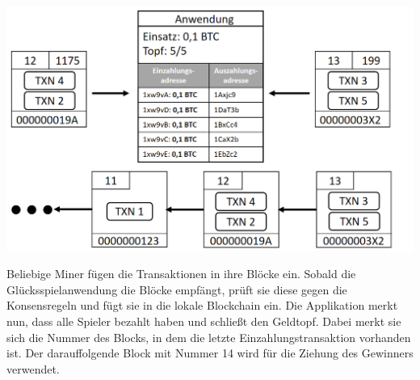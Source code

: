 \vspace{1cm}
\begin{minipage}{0.55\textwidth}
\includegraphics[width=\textwidth]{Figures/konzept_btc/konzept8}
\centering
\decoRule
{}
\label{fig:konzept8}
\end{minipage}
\begin{minipage}{0.45\textwidth}
Beliebige Miner fügen die Transaktionen in ihre Blöcke ein. Sobald die Glücksspielanwendung die Blöcke empfängt, prüft sie diese gegen die Konsensregeln und fügt sie in die lokale Blockchain ein.
Die Applikation merkt nun, dass alle Spieler bezahlt haben und schließt den Geldtopf. Dabei merkt sie sich die Nummer des Blocks, in dem die letzte Einzahlungstransaktion vorhanden ist. Der darauffolgende Block mit Nummer 14 wird für die Ziehung des Gewinners verwendet.
\end{minipage}

